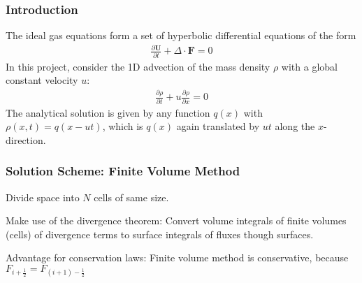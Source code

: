 \begin{frame}
	\frametitle{Introduction}
	The ideal gas equations form a set of hyperbolic differential equations of the form
%	
	\begin{align*}
		\frac{\partial \mathbf{U}}{\partial t} + \Delta \cdot \mathbf{F} = 0
	\end{align*}
%	
	In this project, consider the 1D advection of the mass density $\rho$ with a global constant velocity $u$:
%	
	\begin{align*}
		\frac{\partial \rho}{\partial t} + u \frac{\partial \rho}{\partial x}  = 0
	\end{align*}
%	
	The analytical solution is given by any function $q(x)$ with $\rho(x, t) = q(x-ut)$, which is $q(x)$ again translated by $ut$ along the $x$-direction.
\end{frame}



\begin{frame}
	\frametitle{Solution Scheme: Finite Volume Method}

	Divide space into $N$ cells of same size.

	Make use of the divergence theorem: Convert volume integrals of finite volumes (cells) of divergence terms to surface integrals of fluxes though surfaces.
	
	Advantage for conservation laws: Finite volume method is conservative, because $F_{i+\tfrac{1}{2}} = F_{(i+1)-\tfrac{1}{2}}$
\end{frame}







